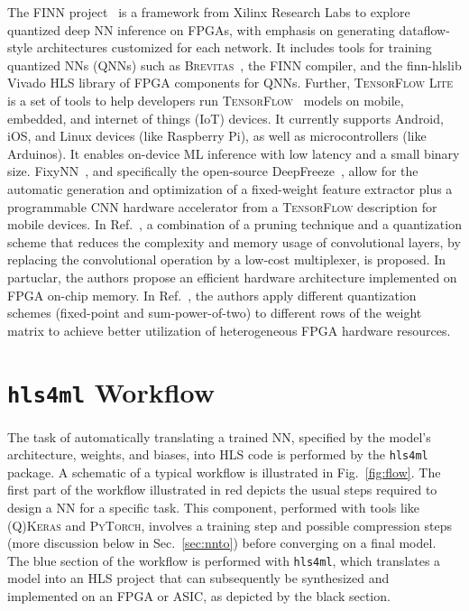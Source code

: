 \documentclass[sigconf]{acmart}
\newcommand{\hlsfml}{\texttt{hls4ml}\xspace}
\begin{document}
The FINN project~\cite{blott2018finnr,FINN,finn_github} is a framework from Xilinx Research Labs to explore quantized deep NN inference on FPGAs, with emphasis on generating dataflow-style architectures customized for each network. 
It includes tools for training quantized NNs (QNNs) such as \textsc{Brevitas}~\cite{brevitas}, the FINN compiler, and the finn-hlslib Vivado HLS library of FPGA components for QNNs. 
Further, \textsc{TensorFlow Lite}~\cite{tflite} is a set of tools to help developers run \textsc{TensorFlow}~\cite{tensorflow2015-whitepaper} models on mobile, embedded, and internet of things (IoT) devices. 
It currently supports Android, iOS, and Linux devices (like Raspberry Pi), as well as microcontrollers (like Arduinos).
It enables on-device ML inference with low latency and a small binary size.
FixyNN~\cite{whatmough2019fixynn}, and specifically the open-source DeepFreeze~\cite{deepfreeze}, allow for the automatic generation and optimization of a fixed-weight feature extractor plus a programmable CNN hardware accelerator from a \textsc{TensorFlow} description for mobile devices.
In Ref.~\cite{hacene2018quantized}, a combination of a pruning technique and a quantization scheme that reduces the complexity and memory usage of convolutional layers, by replacing the convolutional operation by a low-cost multiplexer, is proposed. In partuclar, the authors propose an efficient hardware architecture implemented on FPGA on-chip memory.
In Ref.~\cite{chang2020mix}, the authors apply different quantization schemes (fixed-point and sum-power-of-two) to different rows of the weight matrix to achieve better utilization of heterogeneous FPGA hardware resources. 


\section{\hlsfml Workflow}
\label{sec:flow}

The task of automatically translating a trained NN, specified by the model's architecture, weights, and biases, into HLS code is performed by the \hlsfml package.
A schematic of a typical workflow is illustrated in Fig.~\ref{fig:flow}.
The first part of the workflow illustrated in red depicts the usual steps required to design a NN for a specific task.
This component, performed with tools like \textsc{(Q)Keras} and \textsc{PyTorch}, involves a training step and possible compression steps (more discussion below in Sec.~\ref{sec:nnto}) before converging on a final model.
The blue section of the workflow is performed with \hlsfml, which translates a model into an HLS project that can subsequently be synthesized and implemented on an FPGA or ASIC, as depicted by the black section.
\end{document}
